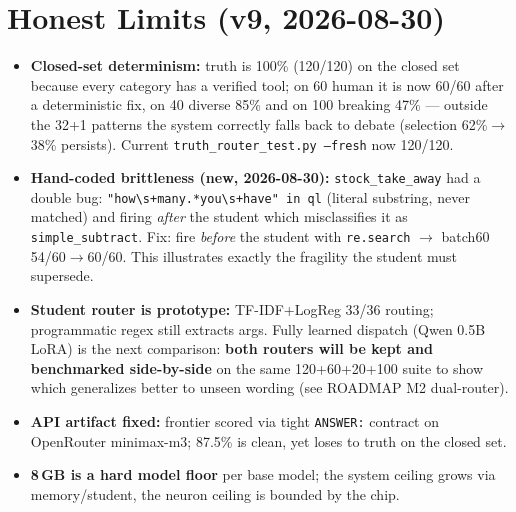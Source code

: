 \documentclass[10pt,twocolumn]{article}
\begin{document}
\section*{Honest Limits (v9, 2026-08-30)}
\begin{itemize}
  \item \textbf{Closed-set determinism:} truth is 100\% (120/120) on the closed set because every category has a verified tool; on 60 human it is now 60/60 after a deterministic fix, on 40 diverse 85\% and on 100 breaking 47\% — outside the 32+1 patterns the system correctly falls back to debate (selection 62\%$\rightarrow$38\% persists). Current \texttt{truth\_router\_test.py --fresh} now 120/120.
  \item \textbf{Hand-coded brittleness (new, 2026-08-30):} \texttt{stock\_take\_away} had a double bug: \texttt{"how\textbackslash s+many.*you\textbackslash s+have" in ql} (literal substring, never matched) and firing \emph{after} the student which misclassifies it as \texttt{simple\_subtract}. Fix: fire \emph{before} the student with \texttt{re.search} $\rightarrow$ batch60 54/60$\rightarrow$60/60. This illustrates exactly the fragility the student must supersede.
  \item \textbf{Student router is prototype:} TF-IDF+LogReg 33/36 routing; programmatic regex still extracts args. Fully learned dispatch (Qwen 0.5B LoRA) is the next comparison: \textbf{both routers will be kept and benchmarked side-by-side} on the same 120+60+20+100 suite to show which generalizes better to unseen wording (see ROADMAP M2 dual-router).
  \item \textbf{API artifact fixed:} frontier scored via tight \texttt{ANSWER:} contract on OpenRouter minimax-m3; 87.5\% is clean, yet loses to truth on the closed set.
  \item \textbf{8\,GB is a hard model floor} per base model; the system ceiling grows via memory/student, the neuron ceiling is bounded by the chip.
\end{itemize}
\end{document}
